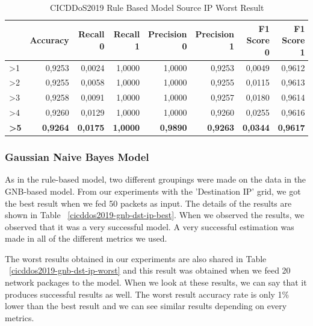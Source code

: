\documentclass{article}
\begin{document}
\begin{table}
  \centering
  \caption{CICDDoS2019 Rule Based Model Source IP Worst Result}
  \label{cicddos2019-rule-based-src-ip-worst}
  \begin{tabular}{lrrrrrrr}
    \toprule
	{Rule & Accuracy & Recall 0 & Recall 1 & Precision 0 & Precision 1 & F1 Score 0 & F1 Score 1} \\
	\midrule
        >1 & 0,9253 & 0,0024 & 1,0000 & 1,0000 & 0,9253 & 0,0049 & 0,9612 \\ \hline
        >2 & 0,9255 & 0,0058 & 1,0000 & 1,0000 & 0,9255 & 0,0115 & 0,9613 \\ \hline
        >3 & 0,9258 & 0,0091 & 1,0000 & 1,0000 & 0,9257 & 0,0180 & 0,9614 \\ \hline
        >4 & 0,9260 & 0,0129 & 1,0000 & 1,0000 & 0,9260 & 0,0255 & 0,9616 \\ \hline
        \textbf{>5} & \textbf{0,9264} & \textbf{0,0175} & \textbf{1,0000} & \textbf{0,9890} & \textbf{0,9263} & \textbf{0,0344} & \textbf{0,9617} \\ 
	\bottomrule
  \end{tabular}
\end{table}

\subsubsection{Gaussian Naive Bayes Model}

As in the rule-based model, two different groupings were made on the data in the GNB-based model. From our experiments with the 'Destination IP' grid, we got the best result when we fed 50 packets as input. The details of the results are shown in Table ~\ref{cicddos2019-gnb-dst-ip-best}. When we observed the results, we observed that it was a very successful model. A very successful estimation was made in all of the different metrics we used.

The worst results obtained in our experiments are also shared in Table ~\ref{cicddos2019-gnb-dst-ip-worst} and this result was obtained when we feed 20 network packages to the model. When we look at these results, we can say that it produces successful results as well. The worst result accuracy rate is only 1\% lower than the best result and we can see similar results depending on every metrics.
\end{document}
